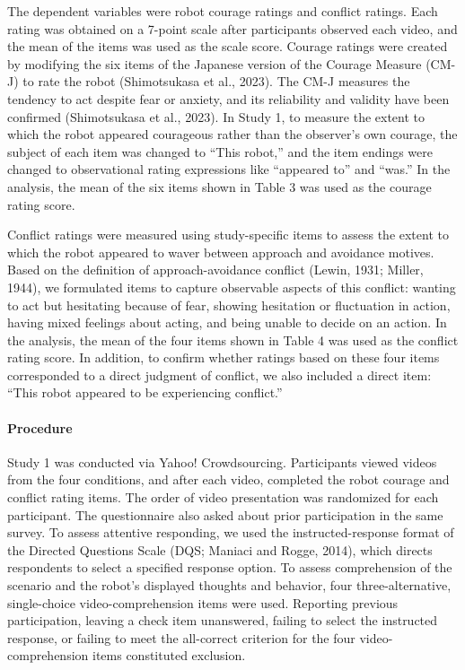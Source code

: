 The dependent variables were robot courage ratings and conflict ratings.
Each rating was obtained on a 7-point scale after participants observed
each video, and the mean of the items was used as the scale score.
Courage ratings were created by modifying the six items of the Japanese
version of the Courage Measure (CM-J) to rate the robot (Shimotsukasa et
al., 2023). The CM-J measures the tendency to act despite fear or
anxiety, and its reliability and validity have been confirmed
(Shimotsukasa et al., 2023). In Study 1, to measure the extent to which
the robot appeared courageous rather than the observer's own courage,
the subject of each item was changed to ``This robot,'' and the item
endings were changed to observational rating expressions like ``appeared
to'' and ``was.'' In the analysis, the mean of the six items shown in
Table 3 was used as the courage rating score.

Conflict ratings were measured using study-specific items to assess the
extent to which the robot appeared to waver between approach and
avoidance motives. Based on the definition of approach-avoidance
conflict (Lewin, 1931; Miller, 1944), we formulated items to capture
observable aspects of this conflict: wanting to act but hesitating
because of fear, showing hesitation or fluctuation in action, having
mixed feelings about acting, and being unable to decide on an action. In
the analysis, the mean of the four items shown in Table 4 was used as
the conflict rating score. In addition, to confirm whether ratings based
on these four items corresponded to a direct judgment of conflict, we
also included a direct item: ``This robot appeared to be experiencing
conflict.''

\paragraph{Procedure}\label{procedure}

Study 1 was conducted via Yahoo! Crowdsourcing. Participants viewed
videos from the four conditions, and after each video, completed the
robot courage and conflict rating items. The order of video presentation
was randomized for each participant. The questionnaire also asked about
prior participation in the same survey. To assess attentive responding,
we used the instructed-response format of the Directed Questions Scale
(DQS; Maniaci and Rogge, 2014), which directs respondents to select a
specified response option. To assess comprehension of the scenario and
the robot's displayed thoughts and behavior, four three-alternative,
single-choice video-comprehension items were used. Reporting previous
participation, leaving a check item unanswered, failing to select the
instructed response, or failing to meet the all-correct criterion for
the four video-comprehension items constituted exclusion.

